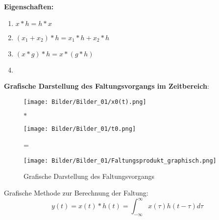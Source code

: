 \textbf{Eigenschaften:}
\begin{enumerate}
    \item 
    $x*h=h*x$
    \item
    $(x_1+x_2)*h=x_1*h+x_2*h$
    \item
    $(x*g)*h=x*(g*h)$
    \item
\end{enumerate}

\textbf{Grafische Darstellung des Faltungsvorgangs im Zeitbereich}:
\begin{figure}[H]
    \centering
    \begin{minipage}{.3\textwidth}
        \texttt{[image: Bilder/Bilder\_01/x0(t).png]}
        \nonumber
    \end{minipage}
    \begin{minipage}{.03\textwidth}
            $\ast$
    \end{minipage}
    \begin{minipage}{.3\textwidth}
             \texttt{[image: Bilder/Bilder\_01/t0.png]}
        \nonumber
    \end{minipage}
    \begin{minipage}{.03\textwidth}
            =
    \end{minipage}
    \begin{minipage}{.3\textwidth}
        \texttt{[image: Bilder/Bilder\_01/Faltungsprodukt\_graphisch.png]}
        \nonumber
    \end{minipage}
    \caption{Grafische Darstellung des Faltungsvorgangs}
    \label{fig:Faltung im Zeitbereich}
\end{figure}

Grafische Methode zur Berechnung der Faltung:\\
\begin{equation}
    y(t)=x(t)\ast h(t)=\int_{-\infty}^{\infty}x(\tau)h(t-\tau)d\tau
\end{equation}


